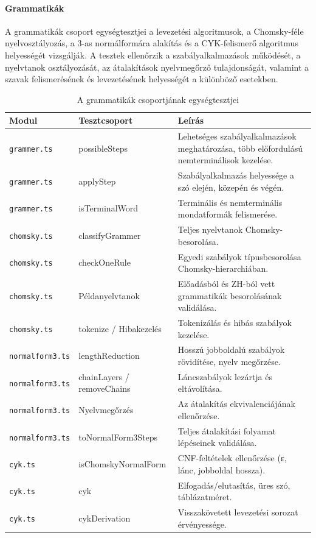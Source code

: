 \paragraph{Grammatikák}
A grammatikák csoport egységtesztjei a levezetési algoritmusok,
 a Chomsky-féle nyelvosztályozás, a 3-as normálformára alakítás 
 és a CYK-felismerő algoritmus helyességét vizsgálják. 
 A tesztek ellenőrzik a szabályalkalmazások működését, 
 a nyelvtanok osztályozását, az átalakítások nyelvmegőrző tulajdonságát,
  valamint a szavak felismerésének és levezetésének helyességét a különböző esetekben.
\begin{table}[H]
    \centering
    \begin{tabularx}{\textwidth}{|l|l|X|}
        \hline
        \textbf{Modul} & \textbf{Tesztcsoport} & \textbf{Leírás} \\ \hline
        \texttt{grammer.ts} & possibleSteps & Lehetséges szabályalkalmazások meghatározása, több előfordulású nemterminálisok kezelése. \\ \hline
        \texttt{grammer.ts} & applyStep & Szabályalkalmazás helyessége a szó elején, közepén és végén. \\ \hline
        \texttt{grammer.ts} & isTerminalWord & Terminális és nemterminális mondatformák felismerése. \\ \hline
        \texttt{chomsky.ts} & classifyGrammer & Teljes nyelvtanok Chomsky-besorolása. \\ \hline
        \texttt{chomsky.ts} & checkOneRule & Egyedi szabályok típusbesorolása Chomsky-hierarchiában. \\ \hline
        \texttt{chomsky.ts} & Példanyelvtanok & Előadásból és ZH-ból vett grammatikák besorolásának validálása. \\ \hline
        \texttt{chomsky.ts} & tokenize / Hibakezelés & Tokenizálás és hibás szabályok kezelése. \\ \hline
        \texttt{normalform3.ts} & lengthReduction & Hosszú jobboldalú szabályok rövidítése, nyelv megőrzése. \\ \hline
        \texttt{normalform3.ts} & chainLayers / removeChains & Láncszabályok lezártja és eltávolítása. \\ \hline
        \texttt{normalform3.ts} & Nyelvmegőrzés & Az átalakítás ekvivalenciájának ellenőrzése. \\ \hline
        \texttt{normalform3.ts} & toNormalForm3Steps & Teljes átalakítási folyamat lépéseinek validálása. \\ \hline
        \texttt{cyk.ts} & isChomskyNormalForm & CNF-feltételek ellenőrzése (ε, lánc, jobboldal hossza). \\ \hline
        \texttt{cyk.ts} & cyk & Elfogadás/elutasítás, üres szó, táblázatméret. \\ \hline
        \texttt{cyk.ts} & cykDerivation & Visszakövetett levezetési sorozat érvényessége. \\ \hline
    \end{tabularx}
    \caption{A grammatikák csoportjának egységtesztjei}
    \label{tab:test_grammar_group}
\end{table}


